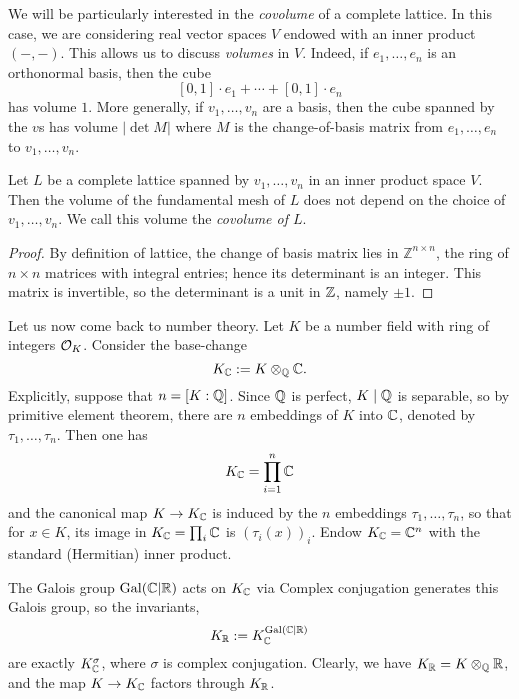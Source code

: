 We will be particularly interested in the \emph{covolume} of a complete lattice.
In this case, we are considering real vector spaces $V$ endowed with an inner product $(-,-)$.
This allows us to discuss \emph{volumes} in $V$.
Indeed, if $e_{1},\ldots,e_{n}$ is an orthonormal basis, then the cube
\[ [0,1] \cdot e_{1} + \cdots + [0,1] \cdot e_{n} \]
has volume $1$.
More generally, if $v_{1},\ldots,v_{n}$ are a basis, then the cube spanned by the $v$s has volume $|\det M|$ where $M$ is the change-of-basis matrix from $e_{1},\ldots,e_{n}$ to $v_{1},\ldots,v_{n}$.

\begin{lemma}
  Let $L$ be a complete lattice spanned by $v_{1},\ldots,v_{n}$ in an inner product space $V$.
  Then the volume of the fundamental mesh of $L$ does not depend on the choice of $v_{1},\ldots,v_{n}$.
  We call this volume the \emph{covolume of $L$}.
\end{lemma}
\begin{proof}
  By definition of lattice, the change of basis matrix lies in $\mathbb Z^{n\times n}$, the ring of $n\times n$ matrices with integral entries; hence its determinant is an integer.
  This matrix is invertible, so the determinant is a unit in $\mathbb{Z}$, namely $\pm 1$.
\end{proof}

Let us now come back to number theory.
Let $K$ be a number field with ring of integers $\mathcal{O}_{K}$.
Consider the base-change
\[ K_{\mathbb{C}} := K \otimes_{\mathbb{Q}} \mathbb{C}. \]
Explicitly, suppose that $n = [K:\mathbb{Q}]$.
Since $\mathbb{Q}$ is perfect, $K\mid \mathbb{Q}$ is separable, so by primitive element theorem, there are $n$ embeddings of $K$ into $\mathbb{C}$, denoted by $\tau_{1},\ldots,\tau_{n}$.
Then one has
\[ K_{\mathbb{C}} = \prod_{i = 1}^{n} \mathbb{C} \]
and the canonical map $K \to K_{\mathbb{C}}$ is induced by the $n$ embeddings $\tau_{1},\ldots,\tau_{n}$, so that for $x \in K$, its image in $K_{\mathbb{C}} = \prod_{i} \mathbb{C}$ is $(\tau_{i}(x))_{i}$.
Endow $K_{\mathbb{C}} = \mathbb{C}^{n}$ with the standard (Hermitian) inner product.

The Galois group $\operatorname{Gal}(\mathbb{C}|\mathbb{R})$ acts on $K_{\mathbb{C}}$ via 
Complex conjugation generates this Galois group, so the invariants,
\[ K_{\mathbb{R}} := K_{\mathbb{C}}^{\operatorname{Gal}(\mathbb{C}|\mathbb{R})} \]
are exactly $K_{\mathbb{C}}^{\sigma}$, where $\sigma$ is complex conjugation.
Clearly, we have $K_{\mathbb{R}} = K \otimes_{\mathbb{Q}} \mathbb{R}$, and the map $K \to K_{\mathbb{C}}$ factors through $K_{\mathbb{R}}$.

